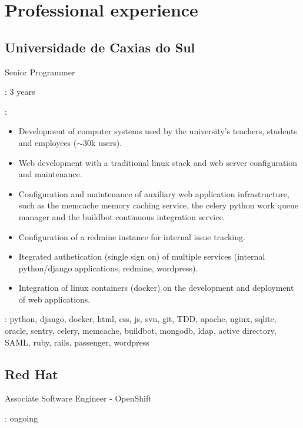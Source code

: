 \section*{Professional experience}
\subsection*{Universidade de Caxias do Sul}

Senior Programmer

\begin{description}[noitemsep]
    \item[Duration]: 3 years
    \item[Attributions]:
        \begin{itemize}[noitemsep]
            \item
                Development of computer systems used by the university's
                teachers, students and employees ($\sim$30k users).
            \item
                Web development with a traditional linux stack and web server
                configuration and maintenance.
            \item
                Configuration and maintenance of auxiliary web application
                infrastructure, such as the memcache memory caching service,
                the celery python work queue manager and the buildbot
                continuous integration service.
            \item
                Configuration of a redmine instance for internal issue
                tracking.
            \item
                Itegrated authetication (single sign on) of multiple services
                (internal python/django applications, redmine, wordpress).
            \item
                Integration of linux containers (docker) on the development
                and deployment of web applications.
        \end{itemize}
    \item[Technologies]:
        python, django, docker, html, css, js, svn, git, TDD, apache, nginx,
        sqlite, oracle, sentry, celery, memcache, buildbot, mongodb, ldap,
        active directory, SAML, ruby, rails, passenger, wordpress
\end{description}

\subsection*{Red Hat}

Associate Software Engineer - OpenShift

\begin{description}[noitemsep]
    \item[Duration]: ongoing
\end{description}
